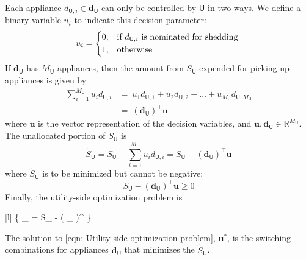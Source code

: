 \documentclass[journal, a4paper]{IEEEtran}
\begin{document}
Each appliance $d_{\mathsf{U},i} \in \mathbf{d}_{\mathsf{U}}$ can only be controlled by $\mathsf{U}$ in two ways.
We define a binary variable $u_{i}$ to indicate this decision parameter:
\begin{equation}
	\label{eqn: Utility-side optimization variable}
	u_{i} =
	\begin{cases*}
		0, & if $d_{\mathsf{U},i}$ is nominated for shedding \\
		1, & otherwise
	\end{cases*}
\end{equation}
If $\mathbf{d}_{\mathsf{U}}$ has $M_{\mathsf{U}}$ appliances, then the amount from $S_{\mathsf{U}}$ expended for picking up appliances is given by
\begin{equation}
	\label{eqn: Supply utilized for appliance pick-up in utility-side optimization}
	\begin{split}
		\sum_{i=1}^{M_{\mathsf{U}}} u_{i} d_{\mathsf{U},i} &=\
		u_{1} d_{\mathsf{U},1} + u_{2} d_{\mathsf{U},2} + \ldots + u_{M_{\mathsf{U}}} d_{\mathsf{U},M_{\mathsf{U}}} \\
		&=\ \left( \mathbf{d}_{\mathsf{U}} \right)^{\intercal} \mathbf{u}
	\end{split}
\end{equation}
where $\mathbf{u}$ is the vector representation of the decision variables,
and $\mathbf{u}, \mathbf{d}_{\mathsf{U}} \in \mathbb{R}^{M_{\mathsf{U}}}$.
The unallocated portion of $S_{\mathsf{U}}$ is
\begin{equation}
	\label{eqn: Supply not utilized for appliance pick-up in utility-side optimization}
	\tilde{S}_{\mathsf{U}} = S_{\mathsf{U}} - \sum_{i=1}^{M_{\mathsf{U}}} u_{i} d_{\mathsf{U},i} = S_{\mathsf{U}} - \left( \mathbf{d}_{\mathsf{U}} \right)^{\intercal} \mathbf{u}
\end{equation}
where $\tilde{S}_{\mathsf{U}}$ is to be minimized but cannot be negative:
\begin{equation}
	\label{eqn: Supply not utilized for appliance pick-up in utility-side optimization must be nonnegative}
	S_{\mathsf{U}} - \left( \mathbf{d}_{\mathsf{U}} \right)^{\intercal} \mathbf{u} \geq 0
\end{equation}
Finally, the utility-side optimization problem is
\begin{mini!}|l|
	{  }
	{ \left\{ _{} = S_{} - \left( _{} \right)^{\intercal}  \right\} }
	{ \label{eqn: Utility-side optimization problem} }
	{}{}
	\addConstraint{ u_{i} \in \left\{0,1\right\},\ i=1,2,\ldots,M_{\mathsf{U}} }
\end{mini!}
The solution to \eqref{eqn: Utility-side optimization problem}, $\mathbf{u}^{\ast}$,
is the switching combinations for appliances $\mathbf{d}_{\mathsf{U}}$ that minimizes the $\tilde{S}_{\mathsf{U}}$.
\end{document}
